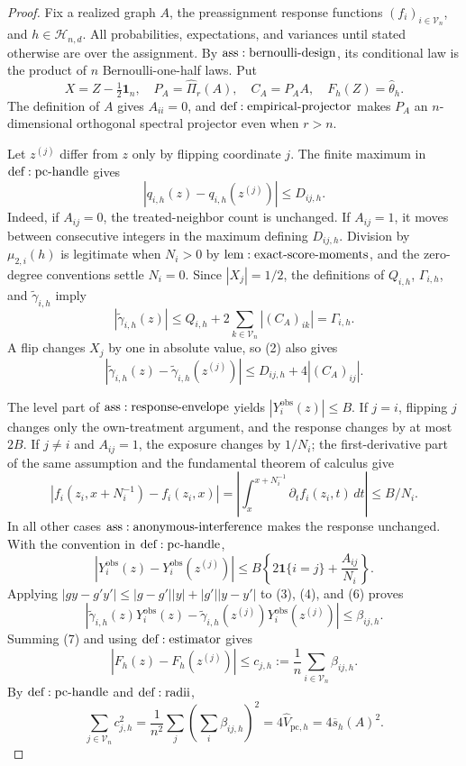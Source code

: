 \documentclass{article}
\begin{document}
\begin{proof}
Fix a realized graph \(A\), the preassignment response functions \((f_i)_{i\in\mathcal V_n}\), and \(h\in\mathcal H_{n,d}\).  All probabilities, expectations, and variances until stated otherwise are over the assignment.  By \({\rm ass:bernoulli\text{-}design}\), its conditional law is the product of \(n\) Bernoulli-one-half laws.  Put
\[
 X=Z-\tfrac12\mathbf1_n,\quad
 P_A=\widehat\Pi_r(A),\quad C_A=P_AA,
 \quad F_h(Z)=\widehat\theta_h.
\tag{1}
\]
The definition of \(A\) gives \(A_{ii}=0\), and \({\rm def:empirical\text{-}projector}\) makes \(P_A\) an \(n\)-dimensional orthogonal spectral projector even when \(r>n\).

Let \(z^{(j)}\) differ from \(z\) only by flipping coordinate \(j\).  The finite maximum in \({\rm def:pc\text{-}handle}\) gives
\[
 |q_{i,h}(z)-q_{i,h}(z^{(j)})|\leq D_{ij,h}.
\tag{2}
\]
Indeed, if \(A_{ij}=0\), the treated-neighbor count is unchanged.  If \(A_{ij}=1\), it moves between consecutive integers in the maximum defining \(D_{ij,h}\).  Division by \(\mu_{2,i}(h)\) is legitimate when \(N_i>0\) by \({\rm lem:exact\text{-}score\text{-}moments}\), and the zero-degree conventions settle \(N_i=0\).  Since \(|X_j|=1/2\), the definitions of \(Q_{i,h}\), \(\Gamma_{i,h}\), and \(\widetilde\gamma_{i,h}\) imply
\[
 |\widetilde\gamma_{i,h}(z)|
 \leq Q_{i,h}+2\sum_{k\in\mathcal V_n}|(C_A)_{ik}|
 =\Gamma_{i,h}.
\tag{3}
\]
A flip changes \(X_j\) by one in absolute value, so (2) also gives
\[
 |\widetilde\gamma_{i,h}(z)-\widetilde\gamma_{i,h}(z^{(j)})|
 \leq D_{ij,h}+4|(C_A)_{ij}|.
\tag{4}
\]

The level part of \({\rm ass:response\text{-}envelope}\) yields \(|Y_i^{\mathrm{obs}}(z)|\leq B\).  If \(j=i\), flipping \(j\) changes only the own-treatment argument, and the response changes by at most \(2B\).  If \(j\ne i\) and \(A_{ij}=1\), the exposure changes by \(1/N_i\); the first-derivative part of the same assumption and the fundamental theorem of calculus give
\[
 |f_i(z_i,x+N_i^{-1})-f_i(z_i,x)|
 =\left|\int_x^{x+N_i^{-1}}\partial_t f_i(z_i,t)\,dt\right|
 \leq B/N_i.
\tag{5}
\]
In all other cases \({\rm ass:anonymous\text{-}interference}\) makes the response unchanged.  With the convention in \({\rm def:pc\text{-}handle}\),
\[
 |Y_i^{\mathrm{obs}}(z)-Y_i^{\mathrm{obs}}(z^{(j)})|
 \leq B\left\{2\mathbf1\{i=j\}+\frac{A_{ij}}{N_i}\right\}.
\tag{6}
\]
Applying \(|gy-g'y'|\leq|g-g'||y|+|g'||y-y'|\) to (3), (4), and (6) proves
\[
 |\widetilde\gamma_{i,h}(z)Y_i^{\mathrm{obs}}(z)
 -\widetilde\gamma_{i,h}(z^{(j)})Y_i^{\mathrm{obs}}(z^{(j)})|
 \leq\beta_{ij,h}.
\tag{7}
\]
Summing (7) and using \({\rm def:estimator}\) gives
\[
 |F_h(z)-F_h(z^{(j)})|
 \leq c_{j,h}:=\frac1n\sum_{i\in\mathcal V_n}\beta_{ij,h}.
\tag{8}
\]
By \({\rm def:pc\text{-}handle}\) and \({\rm def:radii}\),
\[
 \sum_{j\in\mathcal V_n}c_{j,h}^2
 =\frac1{n^2}\sum_j\left(\sum_i\beta_{ij,h}\right)^2
 =4\widehat V_{\mathrm{pc},h}=4\overline s_h(A)^2.
\tag{9}
\]


\end{proof}
\end{document}
